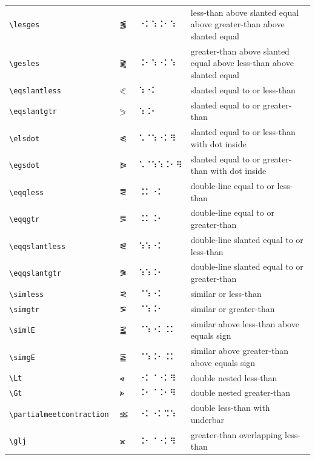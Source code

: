 \documentclass[oneside]{article}
\begin{document}
\begin{longtable}{llll}
\verb|\lesges| & $\lesges$ &   ⠐⠅⠱⠨⠂⠱   & \begin{minipage}[t]{8cm}{less-than above slanted equal above greater-than above slanted equal}
\end{minipage}\\[4ex]
\verb|\gesles| & $\gesles$ &   ⠨⠂⠱⠐⠅⠱   & \begin{minipage}[t]{8cm}{greater-than above slanted equal above less-than above slanted equal}
\end{minipage}\\[4ex]
\verb|\eqslantless| & $\eqslantless$ &   ⠱⠐⠅   & {slanted equal to or less-than} \\[2ex]
\verb|\eqslantgtr| & $\eqslantgtr$ &   ⠱⠨⠂   & {slanted equal to or greater-than} \\[2ex]
\verb|\elsdot| & $\elsdot$ &   ⠡⠈⠱⠐⠅⠻   & {slanted equal to or less-than with dot inside} \\[2ex]
\verb|\egsdot| & $\egsdot$ &   ⠡⠈⠱⠱⠨⠂⠻   & {slanted equal to or greater-than with dot inside} \\[2ex]
\verb|\eqqless| & $\eqqless$ &   ⠨⠅⠐⠅   & {double-line equal to or less-than} \\[2ex]
\verb|\eqqgtr| & $\eqqgtr$ &   ⠨⠅⠨⠂   & {double-line equal to or greater-than} \\[2ex]
\verb|\eqqslantless| & $\eqqslantless$ &   ⠱⠱⠐⠅   & {double-line slanted equal to or less-than} \\[2ex]
\verb|\eqqslantgtr| & $\eqqslantgtr$ &   ⠱⠱⠨⠂   & {double-line slanted equal to or greater-than} \\[2ex]
\verb|\simless| & $\simless$ &   ⠈⠱⠐⠅   & {similar or less-than} \\[2ex]
\verb|\simgtr| & $\simgtr$ &   ⠈⠱⠨⠂   & {similar or greater-than} \\[2ex]
\verb|\simlE| & $\simlE$ &   ⠈⠱⠐⠅⠨⠅   & {similar above less-than above equals sign} \\[2ex]
\verb|\simgE| & $\simgE$ &   ⠈⠱⠨⠂⠨⠅   & {similar above greater-than above equals sign} \\[2ex]
\verb|\Lt| & $\Lt$ &   ⠐⠅⠈⠐⠅⠻   & {double nested less-than} \\[2ex]
\verb|\Gt| & $\Gt$ &   ⠨⠂⠈⠨⠂⠻   & {double nested greater-than} \\[2ex]
\verb|\partialmeetcontraction| & $\partialmeetcontraction$ &   ⠐⠅⠐⠅⠩⠱   & {double less-than with underbar} \\[2ex]
\verb|\glj| & $\glj$ &   ⠨⠂⠈⠐⠅⠻   & {greater-than overlapping less-than} \\[2ex]

\end{longtable}
\end{document}
